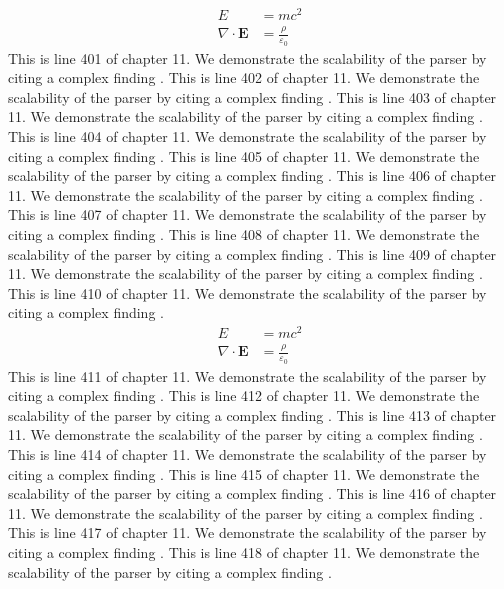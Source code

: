 \begin{align*}
  E &= mc^2 \\
  \nabla \cdot \mathbf{E} &= \frac{\rho}{\varepsilon_0}
\end{align*}
This is line 401 of chapter 11. We demonstrate the scalability of the parser by citing a complex finding \cite{ref11_401}.
This is line 402 of chapter 11. We demonstrate the scalability of the parser by citing a complex finding \cite{ref11_402}.
This is line 403 of chapter 11. We demonstrate the scalability of the parser by citing a complex finding \cite{ref11_403}.
This is line 404 of chapter 11. We demonstrate the scalability of the parser by citing a complex finding \cite{ref11_404}.
This is line 405 of chapter 11. We demonstrate the scalability of the parser by citing a complex finding \cite{ref11_405}.
This is line 406 of chapter 11. We demonstrate the scalability of the parser by citing a complex finding \cite{ref11_406}.
This is line 407 of chapter 11. We demonstrate the scalability of the parser by citing a complex finding \cite{ref11_407}.
This is line 408 of chapter 11. We demonstrate the scalability of the parser by citing a complex finding \cite{ref11_408}.
This is line 409 of chapter 11. We demonstrate the scalability of the parser by citing a complex finding \cite{ref11_409}.
This is line 410 of chapter 11. We demonstrate the scalability of the parser by citing a complex finding \cite{ref11_410}.
\begin{align*}
  E &= mc^2 \\
  \nabla \cdot \mathbf{E} &= \frac{\rho}{\varepsilon_0}
\end{align*}
This is line 411 of chapter 11. We demonstrate the scalability of the parser by citing a complex finding \cite{ref11_411}.
This is line 412 of chapter 11. We demonstrate the scalability of the parser by citing a complex finding \cite{ref11_412}.
This is line 413 of chapter 11. We demonstrate the scalability of the parser by citing a complex finding \cite{ref11_413}.
This is line 414 of chapter 11. We demonstrate the scalability of the parser by citing a complex finding \cite{ref11_414}.
This is line 415 of chapter 11. We demonstrate the scalability of the parser by citing a complex finding \cite{ref11_415}.
This is line 416 of chapter 11. We demonstrate the scalability of the parser by citing a complex finding \cite{ref11_416}.
This is line 417 of chapter 11. We demonstrate the scalability of the parser by citing a complex finding \cite{ref11_417}.
This is line 418 of chapter 11. We demonstrate the scalability of the parser by citing a complex finding \cite{ref11_418}.
